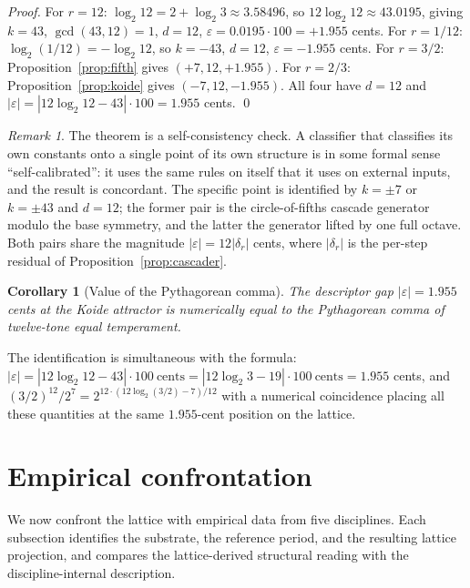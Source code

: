 \documentclass[11pt,a4paper]{article}
\newtheorem{corollary}[theorem]{Corollary}
\theoremstyle{definition}
\theoremstyle{remark}
\newtheorem{remark}[theorem]{Remark}
\newcommand{\eps}{\varepsilon}
\begin{document}
\begin{proof}
For $r=12$: $\log_{2}12 = 2 + \log_{2}3 \approx 3.58496$, so $12\log_{2}12 \approx 43.0195$, giving $k=43$, $\gcd(43,12)=1$, $d=12$, $\eps = 0.0195\cdot 100 = +1.955$ cents. For $r=1/12$: $\log_{2}(1/12) = -\log_{2}12$, so $k=-43$, $d=12$, $\eps = -1.955$ cents. For $r=3/2$: Proposition~\ref{prop:fifth} gives $(+7,12,+1.955)$. For $r=2/3$: Proposition~\ref{prop:koide} gives $(-7,12,-1.955)$. All four have $d=12$ and $|\eps| = |12\log_{2}12 - 43|\cdot 100 = 1.955$ cents. \qed
\end{proof}

\begin{remark}
The theorem is a self-consistency check. A classifier that classifies its own constants onto a single point of its own structure is in some formal sense ``self-calibrated'': it uses the same rules on itself that it uses on external inputs, and the result is concordant. The specific point is identified by $k=\pm 7$ or $k=\pm 43$ and $d=12$; the former pair is the circle-of-fifths cascade generator modulo the base symmetry, and the latter the generator lifted by one full octave. Both pairs share the magnitude $|\eps| = 12|\delta_{r}|$ cents, where $|\delta_{r}|$ is the per-step residual of Proposition~\ref{prop:cascader}.
\end{remark}

\begin{corollary}[Value of the Pythagorean comma]\label{cor:comma}
The descriptor gap $|\eps|=1.955$ cents at the Koide attractor is numerically equal to the Pythagorean comma of twelve-tone equal temperament.
\end{corollary}

The identification is simultaneous with the formula: $|\eps| = |12\log_{2}12 - 43| \cdot 100\ \text{cents} = |12\log_{2}3 - 19|\cdot 100\ \text{cents} = 1.955$ cents, and $(3/2)^{12}/2^{7} = 2^{12\cdot(12\log_{2}(3/2)-7)/12}$ with a numerical coincidence placing all these quantities at the same $1.955$-cent position on the lattice.

\section{Empirical confrontation}\label{sec:applications}

We now confront the lattice with empirical data from five disciplines. Each subsection identifies the substrate, the reference period, and the resulting lattice projection, and compares the lattice-derived structural reading with the discipline-internal description.
\end{document}
